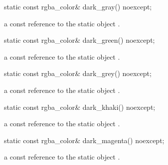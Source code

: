 \begin{itemdecl}
    static const rgba_color& dark_gray() noexcept;
\end{itemdecl}
\begin{itemdescr}
    \pnum
    \returns
    a const reference to the static  object .
\end{itemdescr}

\begin{itemdecl}
    static const rgba_color& dark_green() noexcept;
\end{itemdecl}
\begin{itemdescr}
    \pnum
    \returns
    a const reference to the static  object .
\end{itemdescr}

\begin{itemdecl}
    static const rgba_color& dark_grey() noexcept;
\end{itemdecl}
\begin{itemdescr}
    \pnum
    \returns
    a const reference to the static  object .
\end{itemdescr}

\begin{itemdecl}
    static const rgba_color& dark_khaki() noexcept;
\end{itemdecl}
\begin{itemdescr}
    \pnum
    \returns
    a const reference to the static  object .
\end{itemdescr}

\begin{itemdecl}
    static const rgba_color& dark_magenta() noexcept;
\end{itemdecl}
\begin{itemdescr}
    \pnum
    \returns
    a const reference to the static  object .
\end{itemdescr}

